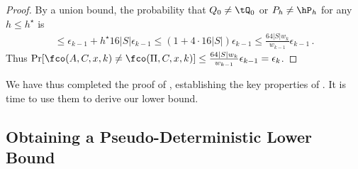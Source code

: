 \begin{itemize}
\begin{itemize}
\begin{proof}
  By a union bound, the probability that $Q_0 \ne \tQ_0$ or $P_h \ne \hP_h$ for any $h \le h^\star$ is
  \begin{align*}
    \le \epsilon_{k-1} + h^\star 16 |S| \epsilon_{k-1} \le (1 + 4 \cdot 16 |S|) \epsilon_{k-1} \le \frac{64 |S| w_k}{w_{k-1}} \epsilon_{k-1} \,.
  \end{align*}
  Thus $\Pr[\fco(A, C, x, k) \ne \fco(\Pi, C, x, k)] \le \frac{64 |S| w_k}{w_{k-1}} \epsilon_{k-1} = \epsilon_k$.
\end{proof}

We have thus completed the proof of , establishing
the key properties of \fco. It is time to use them to derive our lower bound.

\subsection{Obtaining a Pseudo-Deterministic Lower Bound}


\end{itemize}
\end{itemize}
